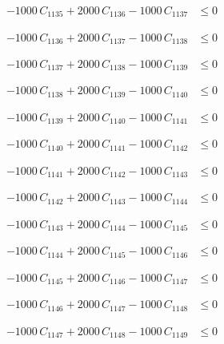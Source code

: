 \documentclass[a4paper,11pt]{article}
\begin{document}
\begin{align}
-1000\,C_{1135} + 2000\,C_{1136} - 1000\,C_{1137} &\leq 0 \nonumber
\end{align}

\begin{align}
-1000\,C_{1136} + 2000\,C_{1137} - 1000\,C_{1138} &\leq 0 \nonumber
\end{align}

\begin{align}
-1000\,C_{1137} + 2000\,C_{1138} - 1000\,C_{1139} &\leq 0 \nonumber
\end{align}

\begin{align}
-1000\,C_{1138} + 2000\,C_{1139} - 1000\,C_{1140} &\leq 0 \nonumber
\end{align}

\begin{align}
-1000\,C_{1139} + 2000\,C_{1140} - 1000\,C_{1141} &\leq 0 \nonumber
\end{align}

\begin{align}
-1000\,C_{1140} + 2000\,C_{1141} - 1000\,C_{1142} &\leq 0 \nonumber
\end{align}

\begin{align}
-1000\,C_{1141} + 2000\,C_{1142} - 1000\,C_{1143} &\leq 0 \nonumber
\end{align}

\begin{align}
-1000\,C_{1142} + 2000\,C_{1143} - 1000\,C_{1144} &\leq 0 \nonumber
\end{align}

\begin{align}
-1000\,C_{1143} + 2000\,C_{1144} - 1000\,C_{1145} &\leq 0 \nonumber
\end{align}

\begin{align}
-1000\,C_{1144} + 2000\,C_{1145} - 1000\,C_{1146} &\leq 0 \nonumber
\end{align}

\begin{align}
-1000\,C_{1145} + 2000\,C_{1146} - 1000\,C_{1147} &\leq 0 \nonumber
\end{align}

\begin{align}
-1000\,C_{1146} + 2000\,C_{1147} - 1000\,C_{1148} &\leq 0 \nonumber
\end{align}

\begin{align}
-1000\,C_{1147} + 2000\,C_{1148} - 1000\,C_{1149} &\leq 0 \nonumber
\end{align}
\end{document}
